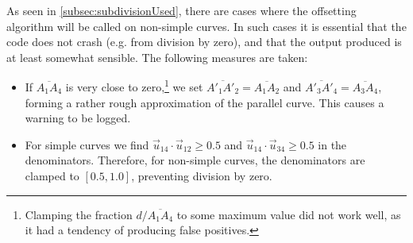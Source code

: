 \documentclass[12pt,a4paper]{article}
\theoremstyle{definition}
\newcommand{\uv}{\vec{u}}
\begin{document}
As seen in \cref{subsec:subdivisionUsed}, there are cases where the offsetting algorithm will be called on non-simple curves. In such cases it is essential that the code does not crash (e.g. from division by zero), and that the output produced is at least somewhat sensible. The following measures are taken:
\begin{itemize}
  \item If $\overline{A_1A_4}$ is very close to zero,\footnote{Clamping the fraction $d/\overline{A_1A_4}$ to some maximum value did not work well, as it had a tendency of producing false positives.} we set $\overline{A'_1A'_2} = \overline{A_1A_2}$ and $\overline{A'_3A'_4} = \overline{A_3A_4}$, forming a rather rough approximation of the parallel curve. This causes a warning to be logged.
  \item For simple curves we find $\uv_{14}\cdot\uv_{12} \geq 0.5$ and  $\uv_{14}\cdot\uv_{34} \geq 0.5$ in the denominators. Therefore, for non-simple curves, the denominators are clamped to $[0.5, 1.0]$, preventing division by zero.
\end{itemize}
\end{document}
